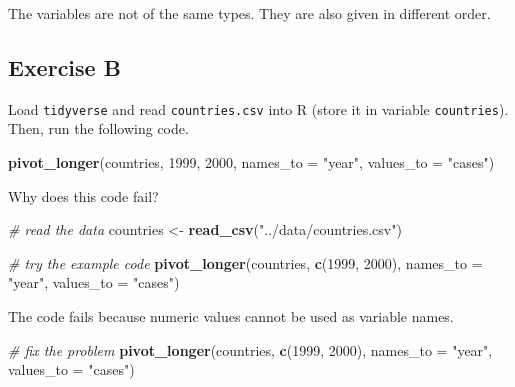 \documentclass[
]{article}
\newenvironment{Shaded}{\begin{snugshade}}{\end{snugshade}}
\newcommand{\CommentTok}[1]{\textcolor[rgb]{0.56,0.35,0.01}{\textit{#1}}}
\newcommand{\DataTypeTok}[1]{\textcolor[rgb]{0.13,0.29,0.53}{#1}}
\newcommand{\DecValTok}[1]{\textcolor[rgb]{0.00,0.00,0.81}{#1}}
\newcommand{\KeywordTok}[1]{\textcolor[rgb]{0.13,0.29,0.53}{\textbf{#1}}}
\newcommand{\NormalTok}[1]{#1}
\newcommand{\StringTok}[1]{\textcolor[rgb]{0.31,0.60,0.02}{#1}}
\begin{document}
The variables are not of the same types. They are also given in
different order.

\hypertarget{exercise-b}{%
\subsection{Exercise B}\label{exercise-b}}

Load \texttt{tidyverse} and read \texttt{countries.csv} into R (store it
in variable \texttt{countries}). Then, run the following code.

\begin{Shaded}
\begin{Highlighting}[]
\KeywordTok{pivot\_longer}\NormalTok{(countries, }\DecValTok{1999}\NormalTok{, }\DecValTok{2000}\NormalTok{, }\DataTypeTok{names\_to =} \StringTok{"year"}\NormalTok{, }\DataTypeTok{values\_to =} \StringTok{"cases"}\NormalTok{)}
\end{Highlighting}
\end{Shaded}

Why does this code fail?

\begin{Shaded}
\begin{Highlighting}[]
\CommentTok{\# read the data}
\NormalTok{countries \textless{}{-}}\StringTok{ }\KeywordTok{read\_csv}\NormalTok{(}\StringTok{"../data/countries.csv"}\NormalTok{)}

\CommentTok{\# try the example code}
\KeywordTok{pivot\_longer}\NormalTok{(countries, }\KeywordTok{c}\NormalTok{(}\DecValTok{1999}\NormalTok{, }\DecValTok{2000}\NormalTok{), }\DataTypeTok{names\_to =}  \StringTok{"year"}\NormalTok{, }\DataTypeTok{values\_to =} \StringTok{"cases"}\NormalTok{)}
\end{Highlighting}
\end{Shaded}

The code fails because numeric values cannot be used as variable names.

\begin{Shaded}
\begin{Highlighting}[]
\CommentTok{\# fix the problem }
\KeywordTok{pivot\_longer}\NormalTok{(countries, }\KeywordTok{c}\NormalTok{(}\StringTok{\textasciigrave{}}\DataTypeTok{1999}\StringTok{\textasciigrave{}}\NormalTok{, }\StringTok{\textasciigrave{}}\DataTypeTok{2000}\StringTok{\textasciigrave{}}\NormalTok{), }\DataTypeTok{names\_to =} \StringTok{"year"}\NormalTok{, }\DataTypeTok{values\_to =} \StringTok{"cases"}\NormalTok{)}
\end{Highlighting}
\end{Shaded}
\end{document}
